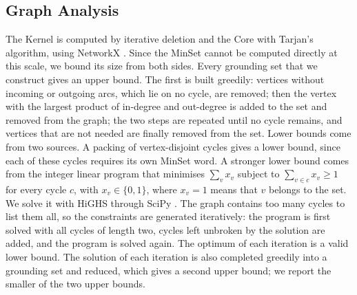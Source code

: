 \documentclass[11pt]{article}
\begin{document}
\subsection{Graph Analysis}
The Kernel is computed by iterative deletion and the Core with Tarjan's algorithm, using NetworkX \cite{hagberg2008}. Since the MinSet cannot be computed directly at this scale, we bound its size from both sides. Every grounding set that we construct gives an upper bound. The first is built greedily: vertices without incoming or outgoing arcs, which lie on no cycle, are removed; then the vertex with the largest product of in-degree and out-degree is added to the set and removed from the graph; the two steps are repeated until no cycle remains, and vertices that are not needed are finally removed from the set. Lower bounds come from two sources. A packing of vertex-disjoint cycles gives a lower bound, since each of these cycles requires its own MinSet word. A stronger lower bound comes from the integer linear program that minimises $\sum_v x_v$ subject to $\sum_{v \in c} x_v \geq 1$ for every cycle $c$, with $x_v \in \{0,1\}$, where $x_v = 1$ means that $v$ belongs to the set. We solve it with HiGHS through SciPy \cite{huangfu2018,virtanen2020}. The graph contains too many cycles to list them all, so the constraints are generated iteratively: the program is first solved with all cycles of length two, cycles left unbroken by the solution are added, and the program is solved again. The optimum of each iteration is a valid lower bound. The solution of each iteration is also completed greedily into a grounding set and reduced, which gives a second upper bound; we report the smaller of the two upper bounds.
\end{document}

